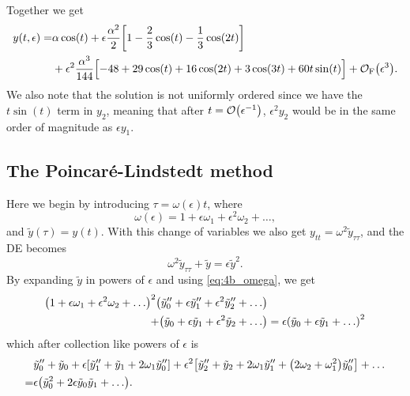 \documentclass[11pt,letter, swedish, english
]{article}
\begin{document}
Together we get
\begin{equation}\label{eq:4_RPT}
\begin{aligned}
y(t, \epsilon)=&\alpha\cos(t)+\epsilon\frac{\alpha^2}{2}
\qty[1-\frac{2}{3}\cos(t)-\frac{1}{3}\cos(2t)]\\
&+\epsilon^2\frac{\alpha^3}{144}
\qty[-48+29\cos(t)+16\cos(2t)+3\cos(3t)+60t\sin(t)\Big.]
+\mathcal{O}_\text{F}\qty(\epsilon^3).
\end{aligned}
\end{equation}
We also note that the solution is not uniformly ordered since we have
the $t\sin(t)$ term in $y_2$, meaning that after
$t=\order{\epsilon^{-1}}$, $\epsilon^2y_2$ would be in the same order
of magnitude as $\epsilon y_1$.


\subsection{The Poincaré-Lindstedt method}
\newcommand{\ty}{\ensuremath{\tilde{y}}}
Here we begin by introducing $\tau=\omega(\epsilon)t$, where
\begin{equation}\label{eq:4b_omega}
\omega(\epsilon)=1+\epsilon\omega_1+\epsilon^2\omega_2+\ldots,
\end{equation}
and $\ty(\tau)=y(t)$.
With this change of variables we also get
$y_{tt}=\omega^2\ty_{\tau\tau}$, and the DE becomes
\begin{equation}
\omega^2\ty_{\tau\tau} +\ty = \epsilon\ty^2.
\end{equation}
By expanding $\ty$ in powers of $\epsilon$ and using
\eqref{eq:4b_omega}, we get
\begin{equation}
\begin{aligned}
\qty(1+\epsilon\omega_1+\epsilon^2\omega_2+\ldots)^2
\qty(\ty_0''+\epsilon\ty_1''+\epsilon^2\ty_2''+\ldots)&\\
+
\qty(\ty_0+\epsilon\ty_1+\epsilon^2\ty_2+\ldots)
&=\epsilon\qty(\ty_0+\epsilon\ty_1+\ldots)^2
\end{aligned}
\end{equation}
which after collection like powers of $\epsilon$ is
\begin{equation}
\begin{aligned}
&\ty_0''+\ty_0+\epsilon\qty[\ty_1''+\ty_1+2\omega_1\ty_0'']
+\epsilon^2\qty[\ty_2''+\ty_2+2\omega_1\ty_1''+\qty(2\omega_2+\omega_1^2)\ty_0'']
+\ldots\\
=&\epsilon\qty(\ty_0^2+2\epsilon\ty_0\ty_1+\ldots).
\end{aligned}
\end{equation}
\end{document}
